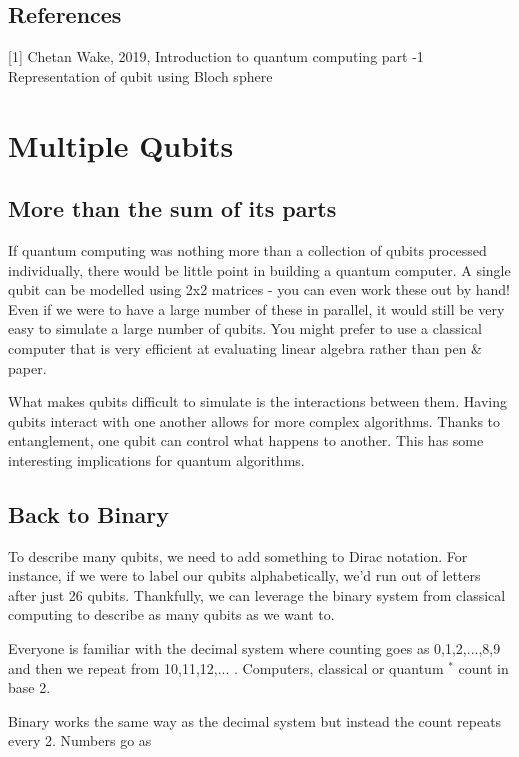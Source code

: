 \documentclass{book}
\begin{document}
\section{References}

[1] Chetan Wake, 2019, Introduction to quantum computing part -1 Representation of qubit using Bloch sphere

\chapter{Multiple Qubits}

\section{ More than the sum of its parts}

If quantum computing was nothing more than a collection of qubits processed individually, there would be little point in building a quantum computer. A single qubit can be modelled using 2x2 matrices - you can even work these out by hand! Even if we were to have a large number of these in parallel, it would still be very easy to simulate a large number of qubits. You might prefer to use a classical computer that is very efficient at evaluating linear algebra rather than pen \& paper. 

What makes qubits difficult to simulate is the interactions between them. Having qubits interact with one another allows for more complex algorithms. Thanks to entanglement, one qubit can control what happens to another. This has some interesting implications for quantum algorithms. 

\section{Back to Binary }


To describe many qubits, we need to add something to Dirac notation. For instance, if we were to label our qubits alphabetically, we'd run out of letters after just 26 qubits. Thankfully, we can leverage the binary system from classical computing to describe as many qubits as we want to. 


Everyone is familiar with the decimal system where counting goes as 0,1,2,...,8,9 and then we repeat from 10,11,12,... . Computers, classical or quantum $^*$ count in base 2. 

Binary works the same way as the decimal system but instead the count repeats every 2. Numbers go as    
\end{document}
